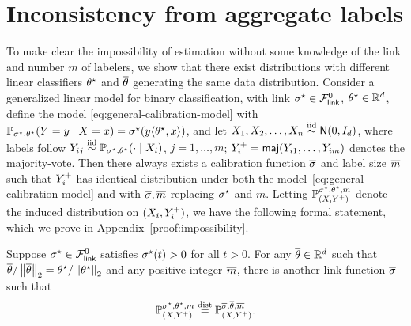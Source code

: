 \section{Inconsistency from aggregate labels}
\label{sec:imp-mv}

%
To make clear the impossibility of estimation without some knowledge of the
link and number $m$ of labelers, we show that there exist distributions with
different linear classifiers $\theta^\star$ and $\overline{\theta}$ generating the
same data distribution.  Consider a generalized linear model for binary
classification, with link  $\sigma^\star \in \mathcal{F}_{\mathsf{link}}^0$, $\theta^\star
\in \mathbb{R}^d$, define the model \eqref{eq:general-calibration-model} with
$\mathbb{P}_{\sigma^\star, \theta^\star}(Y = y \mid X = x) = \sigma^\star ( y \langle
\theta^\star, x\rangle)$, and let $X_1, X_2, \ldots, X_n \stackrel{\textup{iid}}{\sim} \mathsf{N}(0, I_d)$,
where labels follow $Y_{ij}\stackrel{\textup{iid}}{\sim}
\mathbb{P}_{\sigma^\star,\theta^\star}(\cdot \mid X_i)$, $j = 1, \ldots, m$;
$Y^+_i = \mathsf{maj}(Y_{i1}, \ldots, Y_{im})$ denotes the majority-vote.
Then
there always exists a calibration function $\overline{\sigma}$ and label size
$\overline{m}$ such that $Y^+_i$ has identical distribution under both the
model~\eqref{eq:general-calibration-model} and with $\overline{\sigma},
\overline{m}$ replacing $\sigma^\star$ and $m$.  Letting
$\mathbb{P}_{(X,Y^+)}^{\sigma^\star, \theta^\star, m}$ denote the induced distribution
on $(X_i, Y^+_i)$, we have the following formal statement, which we prove
in Appendix~\ref{proof:impossibility}.

\begin{proposition} \label{prop:impossibility}
  Suppose $\sigma^\star \in \mathcal{F}_{\mathsf{link}}^0$ satisfies $\sigma^\star(t) > 0$ for all $ t > 0$. For any $\overline{\theta} \in \mathbb{R}^d$ such that $\overline{\theta}/\left\|{\overline{\theta}}\right\|_2 = \theta^\star/\left\|{\theta^\star}\right\|_2$ and any positive integer $\overline{m}$, there is another link function $\overline{\sigma}$ such that 
  \begin{align*}
    \mathbb{P}_{(X,Y^+)}^{\sigma^\star, \theta^\star, m} \stackrel{\textup{dist}}{=}
    \mathbb{P}_{(X,Y^+)}^{\overline{\sigma}, \overline{\theta}, \overline{m}}.
  \end{align*}
\end{proposition}

